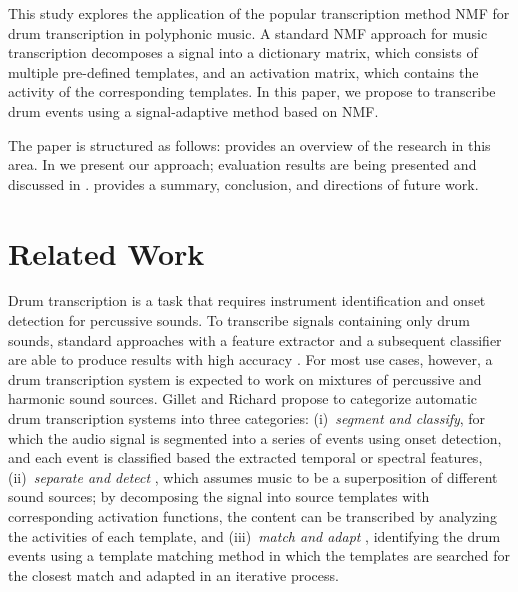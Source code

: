 \documentclass{article}
\begin{document}
This study explores the application of the popular transcription method NMF for drum transcription in polyphonic music. A standard NMF approach for music transcription decomposes a signal into a dictionary matrix, which consists of multiple pre-defined templates, and an activation matrix, which contains the activity of the corresponding templates. In this paper, we propose to transcribe drum events using a signal-adaptive method based on NMF. 

The paper is structured as follows:  provides an overview of the research in this area. In  we present our approach; evaluation results are being presented and discussed in .  provides a summary, conclusion, and directions of future work.

\section{Related Work}\label{sec:related works}
Drum transcription is a task that requires instrument identification and onset detection for percussive sounds. To transcribe signals containing only drum sounds, standard approaches with a feature extractor and a subsequent classifier are able to produce results with high accuracy \cite{herrera_automatic_2003}. For most use cases, however, a drum transcription system is expected to work on mixtures of percussive and harmonic sound sources. Gillet and Richard propose to categorize automatic drum transcription systems into three categories:%
    (i)~\textit{segment and classify}\cite{gillet_automatic_2004, tanghe_algorithm_2005, dittmar_drum_2005}, for which the audio signal is segmented into a series of events using onset detection, and each event is classified based the extracted temporal or spectral features, 
    (ii)~\textit{separate and detect} \cite{fitzgerald_drum_2003, paulus_drum_2005,moreau_drum_2007,alves_drum_2009}, which assumes music to be a superposition of different sound sources; by decomposing the signal into source templates with corresponding activation functions, the content can be transcribed by analyzing the activities of each template, and 
    (iii)~\textit{match and adapt} \cite{yoshii_automatic_2004, yoshii_drum_2007}, identifying the drum events using a template matching method in which the templates are searched for the closest match and adapted in an iterative process.
\end{document}
